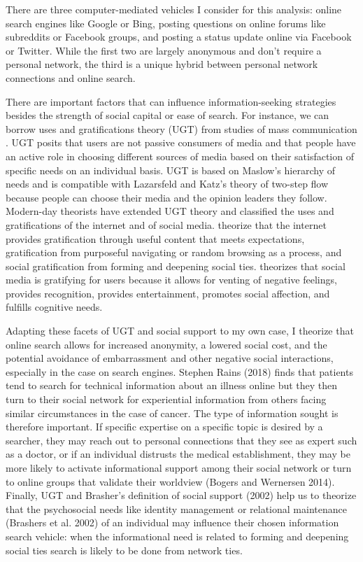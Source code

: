 
There are three computer-mediated vehicles I consider for this analysis: online
search engines like Google or Bing, posting questions on online forums like
subreddits or Facebook groups, and posting a status update online via Facebook
or Twitter. While the first two are largely anonymous and don't require a
personal network, the third is a unique hybrid between personal network
connections and online search.

There are important factors that can influence information-seeking strategies
besides the strength of social capital or ease of search. For instance, we can
borrow uses and gratifications theory (UGT) from studies of mass communication
\citep{blumlerUsesMassCommunications1974, tanMassCommunicationTheories1985}
. UGT
posits that users are not passive consumers of media and that people have an
active role in choosing different sources of media based on their satisfaction
of specific needs on an individual basis. UGT is based on Maslow’s  \citeyear{maslowTheoryHumanMotivation1943} hierarchy of needs and is compatible with
Lazarsfeld and Katz’s theory of two-step flow \cite{katzPersonalInfluencePart1955}
because people can choose their media and the opinion leaders they follow.
Modern-day theorists have extended UGT theory and classified the uses and
gratifications of the internet and of social media. \cite{staffordDeterminingUsesGratifications2004} theorize that the internet
provides gratification through useful content that meets expectations,
gratification from purposeful navigating or random browsing as a process, and
social gratification from forming and deepening social ties. \cite{leungGenerationalDifferencesContent201} theorizes that social media is
gratifying for users because it allows for venting of negative feelings,
provides recognition, provides entertainment, promotes social affection, and
fulfills cognitive needs. 

Adapting these facets of UGT and social support to my own case, I theorize that
online search allows for increased anonymity, a lowered social cost, and the
potential avoidance of embarrassment and other negative social interactions,
especially in the case on search engines. Stephen Rains
(2018) finds that patients tend to search for
technical information about an illness online but they then turn to their social
network for experiential information from others facing similar circumstances in
the case of cancer. The type of information sought is therefore important.
If specific expertise on a specific topic is desired by a searcher, they may
reach out to personal connections that they see as expert such as a doctor, or
if an individual distrusts the medical establishment, they may be more likely to
activate informational support among their social network or turn to online
groups that validate their worldview (Bogers and Wernersen 2014). Finally, UGT and
Brasher's definition of social support
(2002) help us to theorize that the
psychosocial needs like identity management or relational maintenance
(Brashers et al. 2002) of an individual may influence their
chosen information search vehicle: when the informational need is related to
forming and deepening social ties search is likely to be done from network ties.

